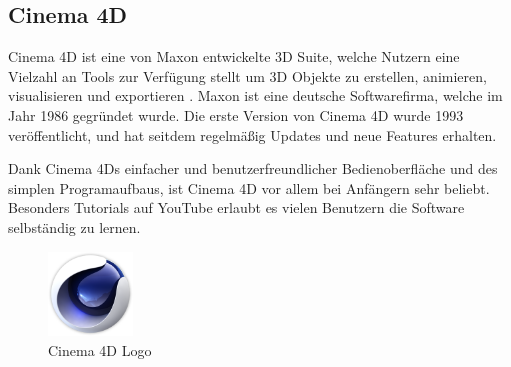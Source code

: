 ﻿\subsection{Cinema 4D}
\label{sec:cinema_4d}

Cinema 4D ist eine von Maxon entwickelte 3D Suite, welche Nutzern eine Vielzahl an Tools zur Verfügung stellt um 3D Objekte zu erstellen, animieren, visualisieren und exportieren . Maxon ist eine deutsche Softwarefirma, welche im Jahr 1986 gegründet wurde. Die erste Version von Cinema 4D wurde 1993 veröffentlicht, und hat seitdem regelmäßig Updates und neue Features erhalten.

Dank Cinema 4Ds einfacher und benutzerfreundlicher Bedienoberfläche und des simplen Programaufbaus, ist Cinema 4D vor allem bei Anfängern sehr beliebt. Besonders Tutorials auf YouTube erlaubt es vielen Benutzern die Software selbständig zu lernen.

\begin{figure}[H]
    \centering
    \includegraphics[width=0.2\textwidth]{images/cinema_4d_logo.png}
    \caption{Cinema 4D Logo }
    \label{fig:cinema_4d_logo}
\end{figure}